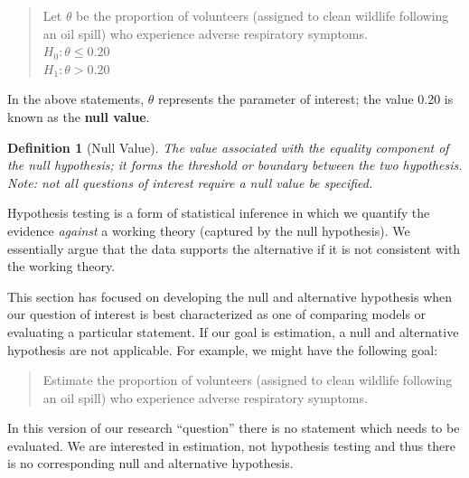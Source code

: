 \documentclass[
]{book}
\theoremstyle{plain}
\theoremstyle{mydefn}
\newtheorem{definition}{Definition}[chapter]
\theoremstyle{myexmpl}
\theoremstyle{remark}
\begin{document}
\begin{quote}
Let \(\theta\) be the proportion of volunteers (assigned to clean wildlife following an oil spill) who experience adverse respiratory symptoms.\\
\(H_0: \theta \leq 0.20\)\\
\(H_1: \theta > 0.20\)
\end{quote}

In the above statements, \(\theta\) represents the parameter of interest; the value 0.20 is known as the \textbf{null value}.

\begin{definition}[Null Value]
\protect\hypertarget{def:defn-null-value}{}{\label{def:defn-null-value} {} }The value associated with the equality component of the null hypothesis; it forms the threshold or boundary between the two hypothesis. Note: not all questions of interest require a null value be specified.
\end{definition}

\begin{rmdkeyidea}
Hypothesis testing is a form of statistical inference in which we quantify the evidence \emph{against} a working theory (captured by the null hypothesis). We essentially argue that the data supports the alternative if it is not consistent with the working theory.
\end{rmdkeyidea}

This section has focused on developing the null and alternative hypothesis when our question of interest is best characterized as one of comparing models or evaluating a particular statement. If our goal is estimation, a null and alternative hypothesis are not applicable. For example, we might have the following goal:

\begin{quote}
Estimate the proportion of volunteers (assigned to clean wildlife following an oil spill) who experience adverse respiratory symptoms.
\end{quote}

In this version of our research ``question'' there is no statement which needs to be evaluated. We are interested in estimation, not hypothesis testing and thus there is no corresponding null and alternative hypothesis.
\end{document}

